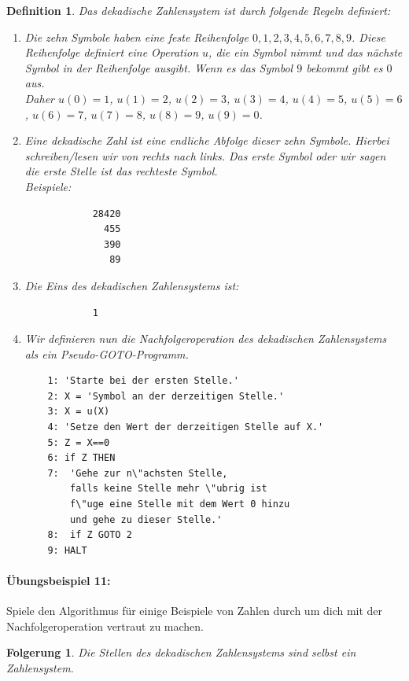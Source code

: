 \documentclass[11pt,a4paper,leqno]{report}
\newtheorem{definition}[theorem]{Definition}
\newtheorem{corollary}[theorem]{Folgerung}
\numberwithin{equation}{chapter}
\begin{document}
\begin{definition}
	Das dekadische Zahlensystem ist durch folgende Regeln definiert:
	\begin{enumerate}
		\item Die zehn Symbole haben eine feste Reihenfolge $0, 1, 2, 3, 4, 5, 6, 7, 8, 9$. Diese Reihenfolge definiert eine Operation $u$, die ein Symbol nimmt und das n\"achste Symbol in der Reihenfolge ausgibt. Wenn es das Symbol $9$ bekommt gibt es $0$ aus.\\ Daher $u(0)=1$, $u(1)=2$, $u(2)=3$, $u(3)=4$, $u(4)=5$, $u(5)=6$, $u(6)=7$, $u(7)=8$, $u(8)=9$, $u(9)=0$.
		\item Eine dekadische Zahl ist eine endliche Abfolge dieser zehn Symbole. Hierbei schreiben/lesen wir von rechts nach links. Das erste Symbol oder wir sagen die erste Stelle ist das rechteste Symbol. \\Beispiele:
		\begin{lstlisting}
			28420
			  455
			  390
			   89
		\end{lstlisting}
		\item Die Eins des dekadischen Zahlensystems ist:
		\begin{lstlisting}
			1
		\end{lstlisting}
		\item Wir definieren nun die Nachfolgeroperation des dekadischen Zahlensystems als ein Pseudo-GOTO-Programm. \\
\begin{lstlisting}
	1: 'Starte bei der ersten Stelle.'
	2: X = 'Symbol an der derzeitigen Stelle.'
	3: X = u(X)
	4: 'Setze den Wert der derzeitigen Stelle auf X.'
	5: Z = X==0
	6: if Z THEN
	7: 	'Gehe zur n\"achsten Stelle, 
		falls keine Stelle mehr \"ubrig ist 
		f\"uge eine Stelle mit dem Wert 0 hinzu
		und gehe zu dieser Stelle.'
	8:	if Z GOTO 2
	9: HALT
\end{lstlisting}
	\end{enumerate}
\end{definition}
\paragraph{\"Ubungsbeispiel 11:} Spiele den Algorithmus f\"ur einige Beispiele von Zahlen durch um dich mit der Nachfolgeroperation vertraut zu machen.
\noindent
\begin{corollary}
	Die Stellen des dekadischen Zahlensystems sind selbst ein Zahlensystem.
\end{corollary}
\end{document}
